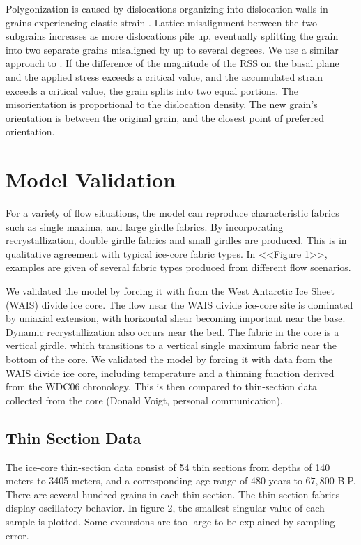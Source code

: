 \documentclass{igs}
\begin{document}
Polygonization is caused by dislocations organizing into dislocation walls in grains experiencing elastic strain \citep{duval1995}. Lattice misalignment between the two subgrains increases as more dislocations pile up, eventually splitting the grain into two separate grains misaligned by up to several degrees. We use a similar approach to \citet{thorsteinsson2002nni}. If the difference of the magnitude of the RSS on the basal plane and the applied stress exceeds a critical value, and the accumulated strain exceeds a critical value, the grain splits into two equal portions. The misorientation is proportional to the dislocation density. The new grain's orientation is between the original grain, and the closest point of preferred orientation. 



\section{Model Validation}
For a variety of flow situations, the model can reproduce characteristic fabrics such as single maxima, and large girdle fabrics. By incorporating recrystallization, double girdle fabrics and small girdles are produced. This is in qualitative agreement with typical ice-core fabric types. In <<Figure 1>>, examples are given of several fabric types produced from different flow scenarios. 

We validated the model by forcing it with from the West Antarctic Ice Sheet (WAIS) divide ice core. The flow near the WAIS divide ice-core site is dominated by uniaxial extension, with horizontal shear becoming important near the base. Dynamic recrystallization also occurs near the bed. The fabric in the core is a vertical girdle, which transitions to a vertical single maximum fabric near the bottom of the core. We validated the model by forcing it with data from the WAIS divide ice core, including temperature and a thinning function derived from the WDC06 chronology. This is then compared to thin-section data collected from the core (Donald Voigt, personal communication).

\subsection{Thin Section Data}
The ice-core thin-section data consist of 54 thin sections from depths of 140 meters to 3405 meters, and a corresponding age range of 480 years to $67,800$ B.P. There are several hundred grains in each thin section. The thin-section fabrics display oscillatory behavior. In figure 2, the smallest singular value of each sample is plotted. Some excursions are too large to be explained by sampling error.  
\end{document}
